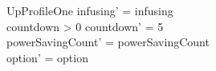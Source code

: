 \begin{schema}{UpProfileOne}
	infusing' = infusing\\
	countdown > 0 \land countdown' = 5\\
	powerSavingCount' = powerSavingCount\\ option' = option\\
\end{schema}

